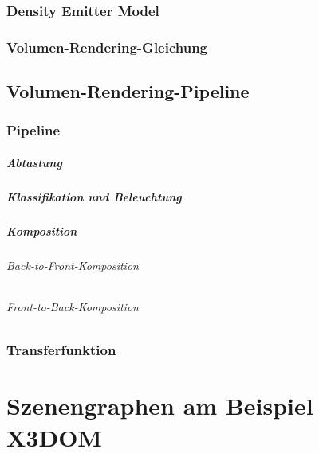 \documentclass[a4paper, 11pt, accentcolor = tud3b]{tudreport}
\begin{document}
			\subsection{Density Emitter Model} %

			\subsection{Volumen-Rendering-Gleichung} %

		\section{Volumen-Rendering-Pipeline} %

			\subsection{Pipeline} %

				\paragraph{Abtastung} %

				\paragraph{Klassifikation und Beleuchtung} %

				\paragraph{Komposition} %

					\subparagraph{Back-to-Front-Komposition} %

					\subparagraph{Front-to-Back-Komposition} %

			\subsection{Transferfunktion} %

	\chapter{Szenengraphen am Beispiel X3DOM} %
\end{document}
